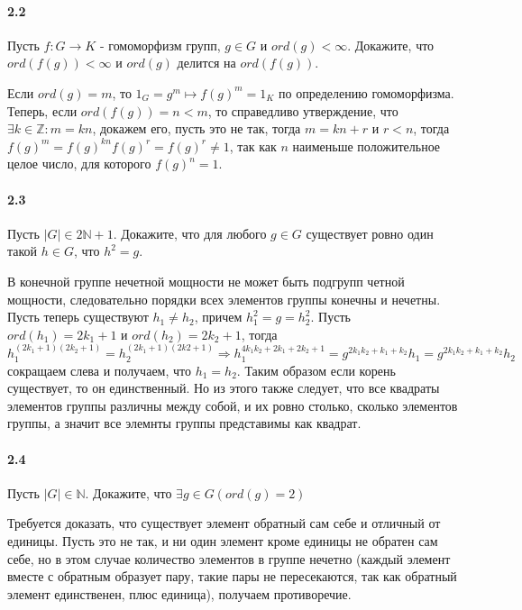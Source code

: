 \documentclass[a4paper,12pt]{article}
\begin{document}
\paragraph{2.2} Пусть $f: G \rightarrow K$ - гомоморфизм групп, $g \in G$ и $ord(g) < \infty$. Докажите, что $ord(f(g)) < \infty$ и $ord(g)$ делится на $ord(f(g))$.

\begin{Solution}
Если $ord(g) = m$, то $1_G = g^m \mapsto f(g)^m = 1_K$ по определению гомоморфизма. Теперь, если $ord(f(g)) = n < m$, то справедливо утверждение, что $\exists k \in \mathbb{Z} : m = kn$, докажем его, пусть это не так, тогда $m = kn + r$ и $r < n$, тогда $f(g)^m = f(g)^{kn}f(g)^r = f(g)^r \not= 1$, так как $n$ наименьше положительное целое число, для которого $f(g)^n = 1$.
\end{Solution}

\paragraph{2.3} Пусть $|G| \in 2\mathbb{N} + 1$. Докажите, что для любого $g \in G$ существует ровно один такой $h \in G$, что $h^2 = g$.

\begin{Solution}
В конечной группе нечетной мощности не может быть подгрупп четной мощности, следовательно порядки всех элементов группы конечны и нечетны. Пусть теперь существуют $h_1 \not = h_2$, причем $h_1^2 = g = h_2^2$. Пусть $ord(h_1) = 2 k_1 + 1$ и $ord(h_2) = 2 k_2 + 1$, тогда $h_1^{(2k_1 + 1)(2k_2 + 1)} = h_2^{(2 k_1 + 1)(2 k2 + 1)} \Rightarrow h_1^{4 k_1 k_2 + 2 k_1 + 2 k_2 + 1} = g^{2k_1k_2 + k_1 + k_2}h_1 = g^{2k_1 k_2 + k_1 + k_2}h_2$ сокращаем слева и получаем, что $h_1 = h_2$. Таким образом если корень существует, то он единственный. Но из этого также следует, что все квадраты элементов группы различны между собой, и их ровно столько, сколько элементов группы, а значит все элемнты группы представимы как квадрат.
\end{Solution}

\paragraph{2.4} Пусть $|G| \in \mathbb{N}$. Докажите, что $\exists g \in G (ord(g) = 2)$

\begin{Solution}
Требуется доказать, что существует элемент обратный сам себе и отличный от единицы. Пусть это не так, и ни один элемент кроме единицы не обратен сам себе, но в этом случае количество элементов в группе нечетно (каждый элемент вместе с обратным образует пару, такие пары не пересекаются, так как обратный элемент единственен, плюс единица), получаем противоречие.
\end{Solution}
\end{document}
